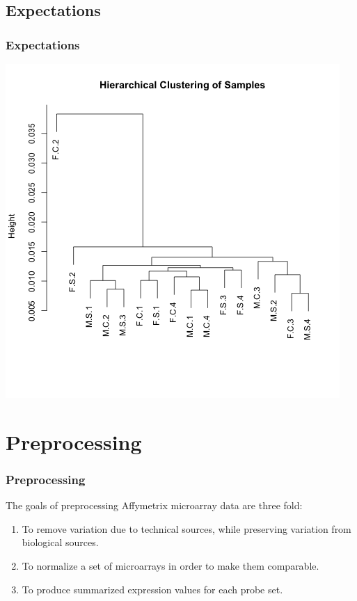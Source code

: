 \documentclass[pdf]{beamer}
\begin{document}
\subsection{Expectations} 

\begin{frame}
  \frametitle{Expectations}  
  \begin{center}
  \includegraphics[scale=0.45]{figures/Figure3.png} 
  \end{center}
\end{frame}


\section{Preprocessing}
\begin{frame}
  \frametitle{Preprocessing}
  The goals of preprocessing Affymetrix microarray data are three fold:
  \begin{enumerate}
    \item To remove variation due to technical sources, while preserving variation from biological sources. 
    \item To normalize a set of microarrays in order to make them comparable.
    \item To produce summarized expression values for each probe set.
  \end{enumerate} 
\end{frame}
\end{document}
